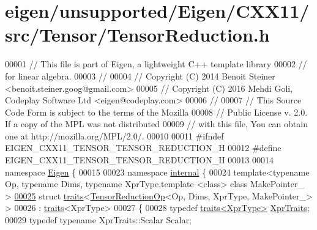 \hypertarget{eigen_2unsupported_2_eigen_2_c_x_x11_2src_2_tensor_2_tensor_reduction_8h_source}{}\section{eigen/unsupported/\+Eigen/\+C\+X\+X11/src/\+Tensor/\+Tensor\+Reduction.h}
\label{eigen_2unsupported_2_eigen_2_c_x_x11_2src_2_tensor_2_tensor_reduction_8h_source}

\begin{DoxyCode}
00001 \textcolor{comment}{// This file is part of Eigen, a lightweight C++ template library}
00002 \textcolor{comment}{// for linear algebra.}
00003 \textcolor{comment}{//}
00004 \textcolor{comment}{// Copyright (C) 2014 Benoit Steiner <benoit.steiner.goog@gmail.com>}
00005 \textcolor{comment}{// Copyright (C) 2016 Mehdi Goli, Codeplay Software Ltd <eigen@codeplay.com>}
00006 \textcolor{comment}{//}
00007 \textcolor{comment}{// This Source Code Form is subject to the terms of the Mozilla}
00008 \textcolor{comment}{// Public License v. 2.0. If a copy of the MPL was not distributed}
00009 \textcolor{comment}{// with this file, You can obtain one at http://mozilla.org/MPL/2.0/.}
00010 
00011 \textcolor{preprocessor}{#ifndef EIGEN\_CXX11\_TENSOR\_TENSOR\_REDUCTION\_H}
00012 \textcolor{preprocessor}{#define EIGEN\_CXX11\_TENSOR\_TENSOR\_REDUCTION\_H}
00013 
00014 \textcolor{keyword}{namespace }\hyperlink{namespace_eigen}{Eigen} \{
00015 
00023 \textcolor{keyword}{namespace }\hyperlink{namespaceinternal}{internal} \{
00024   \textcolor{keyword}{template}<\textcolor{keyword}{typename} Op, \textcolor{keyword}{typename} Dims, \textcolor{keyword}{typename} XprType,\textcolor{keyword}{template} <\textcolor{keyword}{class}> \textcolor{keyword}{class }MakePointer\_ >
\hyperlink{struct_eigen_1_1internal_1_1traits_3_01_tensor_reduction_op_3_01_op_00_01_dims_00_01_xpr_type_00_01_make_pointer___01_4_01_4}{00025}   \textcolor{keyword}{struct }\hyperlink{struct_eigen_1_1internal_1_1traits}{traits}<\hyperlink{class_eigen_1_1_tensor_reduction_op}{TensorReductionOp}<Op, Dims, XprType, MakePointer\_> >
00026  : \hyperlink{struct_eigen_1_1internal_1_1traits}{traits}<XprType>
00027 \{
00028   \textcolor{keyword}{typedef} \hyperlink{struct_eigen_1_1internal_1_1traits}{traits<XprType>} \hyperlink{struct_eigen_1_1internal_1_1traits}{XprTraits};
00029   \textcolor{keyword}{typedef} \textcolor{keyword}{typename} XprTraits::Scalar Scalar;

\end{DoxyCode}
